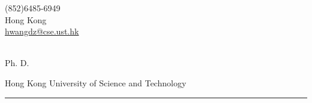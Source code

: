 \begin{center}
    \author{Huaijin Wang}
    \def\role{Ph. D.}
	\begin{minipage}[b]{.3\textwidth}
	\raggedright
	{\large (852)6485-6949} \\ %
	{Hong Kong} \\ %
	\def\email{hwangdz@cse.ust.hk}
	\href{mailto:\email}{\email} %
	\end{minipage}%
	\begin{minipage}[b]{.4\textwidth}
	\makeatletter
	\centering {\HUGE \@author} \\
	\makeatother
    \vspace{.5em}
    {\color{highlight} \Large{\role}}
	\end{minipage}%
	\begin{minipage}[b]{.3\textwidth}
	\raggedleft
	Hong Kong University of Science and Technology
	\end{minipage}

{\color{highlight} \hrule}
\end{center}